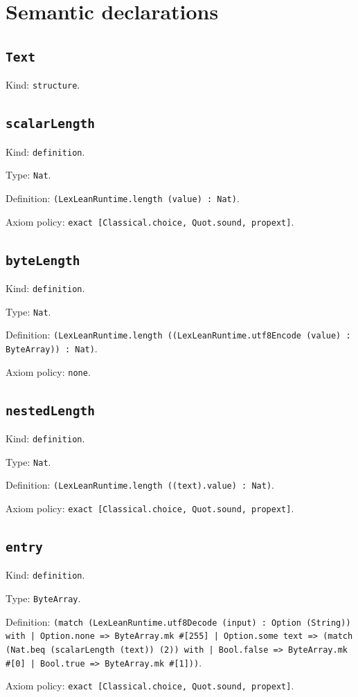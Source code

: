 \documentclass[11pt]{article}
\begin{document}
\section*{Semantic declarations}
\subsection*{\texttt{Text}}
\noindent Kind: \texttt{structure}.\par
\subsection*{\texttt{scalarLength}}
\noindent Kind: \texttt{definition}.\par
\noindent Type: \texttt{Nat}.\par
\noindent Definition: \texttt{(LexLeanRuntime.length (value) : Nat)}.\par
\noindent Axiom policy: \texttt{exact [Classical.choice, Quot.sound, propext]}.\par
\subsection*{\texttt{byteLength}}
\noindent Kind: \texttt{definition}.\par
\noindent Type: \texttt{Nat}.\par
\noindent Definition: \texttt{(LexLeanRuntime.length ((LexLeanRuntime.utf8Encode (value) : ByteArray)) : Nat)}.\par
\noindent Axiom policy: \texttt{none}.\par
\subsection*{\texttt{nestedLength}}
\noindent Kind: \texttt{definition}.\par
\noindent Type: \texttt{Nat}.\par
\noindent Definition: \texttt{(LexLeanRuntime.length ((text).value) : Nat)}.\par
\noindent Axiom policy: \texttt{exact [Classical.choice, Quot.sound, propext]}.\par
\subsection*{\texttt{entry}}
\noindent Kind: \texttt{definition}.\par
\noindent Type: \texttt{ByteArray}.\par
\noindent Definition: \texttt{(match (LexLeanRuntime.utf8Decode (input) : Option (String)) with | Option.none => ByteArray.mk \#[255] | Option.some text => (match (Nat.beq (scalarLength (text)) (2)) with | Bool.false => ByteArray.mk \#[0] | Bool.true => ByteArray.mk \#[1]))}.\par
\noindent Axiom policy: \texttt{exact [Classical.choice, Quot.sound, propext]}.\par
\end{document}
